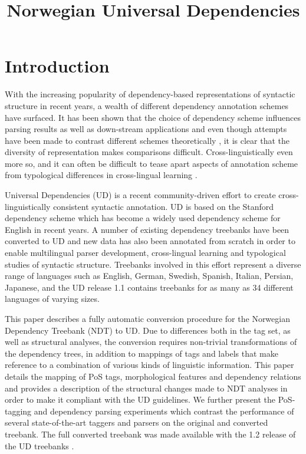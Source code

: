 \documentclass[10pt, a4paper]{article}
\title{Norwegian Universal Dependencies}
\date{}
\begin{document}
\maketitleabstract


\section{Introduction}
With the increasing popularity of dependency-based representations of
syntactic structure in recent years, a wealth of different dependency
annotation schemes have surfaced. It has been shown that the choice of
dependency scheme influences parsing results \cite{Sch:Abe:Rap:12} as
well as down-stream applications \cite{Elm:Joh:Kle:13} and even though
attempts have been made to contrast different schemes theoretically
\cite{Iva:Oep:Ovr:12}, it is clear that the diversity of
representation makes comparisons difficult. Cross-linguistically even
more so, and it can often be difficult to tease apart
aspects of annotation scheme from typological differences in cross-lingual learning \cite{Soe:11,Skj:Ovr:12}.

Universal Dependencies (UD) \cite{Mar:Doz:Sil:14,Niv:15} is a recent
community-driven effort to create cross-linguistically consistent
syntactic annotation. UD is based on the Stanford dependency scheme
\cite{Mar:Mac:Man:06} which has become a widely used dependency scheme
for English in recent years.  A number of existing dependency
treebanks have been converted to UD \cite{Pyy:Kan:Miss:15,Niv:14}
and new data has also been annotated from scratch in order to enable
multilingual parser development, cross-lingual learning and
typological studies of syntactic structure. Treebanks involved in this
effort represent a diverse range of languages such as English, German,
Swedish, Spanish, Italian, Persian, Japanese, and the UD release 1.1
contains treebanks for as many as 34 different languages of varying
sizes.

This paper describes a fully automatic conversion procedure for the
Norwegian Dependency Treebank (NDT) to UD. Due to differences both in
the tag set, as well as structural analyses, the conversion requires
non-trivial transformations of the dependency trees, in addition to
mappings of tags and labels that make reference to a combination of
various kinds of linguistic information.  This paper details the
mapping of PoS tags, morphological features and dependency relations
and provides a description of the structural changes made to NDT
analyses in order to make it compliant with the UD guidelines. We
further present the PoS-tagging and dependency parsing experiments which
contrast the performance of several state-of-the-art taggers and
parsers on the original and converted treebank. The full converted
treebank was made available with the 1.2 release of the UD treebanks
\cite{Niv:Mar:Gin:16}.
\end{document}

